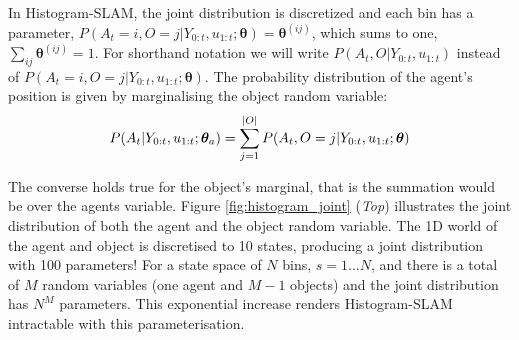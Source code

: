 In Histogram-SLAM, the joint distribution is discretized and each bin has a parameter, 
${P(A_t=i,O=j|Y_{0:t},u_{1:t};\boldsymbol{\theta}) = \boldsymbol{\theta}^{(ij)}}$, which sums to one, ${\sum_{ij} \boldsymbol{\theta}^{(ij)} = 1}$. 
For shorthand notation we will write $P(A_t,O|Y_{0:t},u_{1:t})$ instead of $P(A_t=i,O=j|Y_{0:t},u_{1:t};\boldsymbol{\theta})$.
The probability distribution of the agent's position is given by marginalising the object random variable:
\begin{equation}
 P(A_t|Y_{0:t},u_{1:t};\boldsymbol{\theta}_a)    = \sum\limits_{j=1}^{|O|} P(A_t,O=j|Y_{0:t},u_{1:t};\boldsymbol{\theta}) \label{eq:agent_marginal}
\end{equation}

The converse holds true for the object's marginal, that is the summation would be over 
the agents variable. Figure \ref{fig:histogram_joint} (\textit{Top}) illustrates the joint distribution of both the agent and the object random variable. 
The 1D world of the agent and object is discretised to 10 states, producing a joint distribution with 100 parameters!
For a state space of $N$ bins, $s=1...N$, and there is a total of $M$ random variables (one agent and $M-1$ objects)
and the joint distribution has $N^{M}$ parameters. This exponential increase renders Histogram-SLAM intractable
with this parameterisation.

